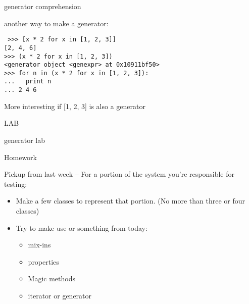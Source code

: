 \documentclass{beamer}
\begin{document}
\begin{frame}[fragile]{generator comprehension}

{\Large another way to make a generator:}

\begin{verbatim}
￼>>> [x * 2 for x in [1, 2, 3]]
[2, 4, 6]
>>> (x * 2 for x in [1, 2, 3])
<generator object <genexpr> at 0x10911bf50>
>>> for n in (x * 2 for x in [1, 2, 3]):
...   print n
... 2 4 6
\end{verbatim}

\vfill
More interesting if [1, 2, 3] is also a generator

\end{frame}


\begin{frame}[fragile]{LAB}

{\Large generator lab}

\end{frame}


\begin{frame}[fragile]{Homework}

\vfill
{\Large Pickup from last week -- For a portion of the system you're responsible for testing:}
\begin{itemize}
  \item Make a few classes to represent that portion. (No more than three or
        four classes)
  \item Try to make use or something from today:
  \begin{itemize}
    \item mix-ins
    \item properties
    \item Magic methods
    \item iterator or generator
  \end{itemize}
\end{itemize}

\vfill
\end{frame}
\end{document}
